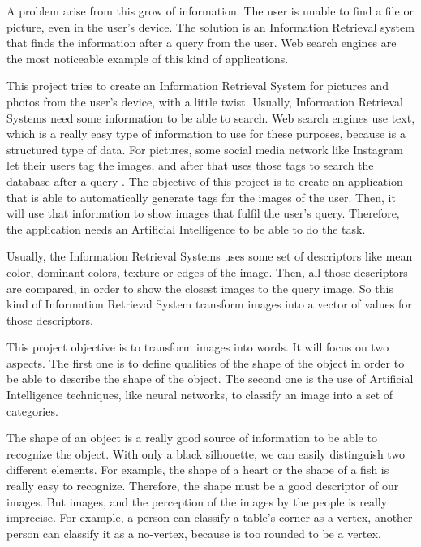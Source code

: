A problem arise from this grow of information. The user is unable to find a file or picture, even in the user’s device. The solution is an Information Retrieval system  that finds the information after a query from the user. Web search engines are the most noticeable example of this kind of applications.

This project tries to create an Information Retrieval System for pictures and photos from the user’s device, with a little twist. Usually, Information Retrieval Systems need some information to be able to search. Web search engines use text, which is a really easy type of information to use for these purposes, because is a structured type of data. For pictures, some social media network like Instagram let their users tag the images, and after that uses those tags to search the database after a query . The objective of this project is to create an application that is able to automatically generate tags for the images of the user. Then, it will use that information to show images that fulfil the user’s query. Therefore, the application needs an Artificial Intelligence to be able to do the task. 

Usually, the Information Retrieval Systems uses some set of descriptors like mean color, dominant colors, texture or edges of the image. Then, all those descriptors are compared, in order to show the closest images to the query image. So this kind of Information Retrieval System transform images into a vector of values for those descriptors.

This project objective is to transform images into words. It will focus on two aspects. The first one is to define qualities of the shape of the object in order to be able to describe the shape of the object. The second one is the use of Artificial Intelligence techniques, like neural networks, to classify an image into a set of categories.

The shape of an object is a really good source of information to be able to recognize the object. With only a black silhouette, we can easily distinguish two different elements. For example, the shape of a heart or the shape of a fish is really easy to recognize. Therefore, the shape must be a good descriptor of our images. But images, and the perception of the images by the people is really imprecise. For example, a person can classify a table’s corner as a vertex, another person can classify it as a no-vertex, because is too rounded to be a vertex.

